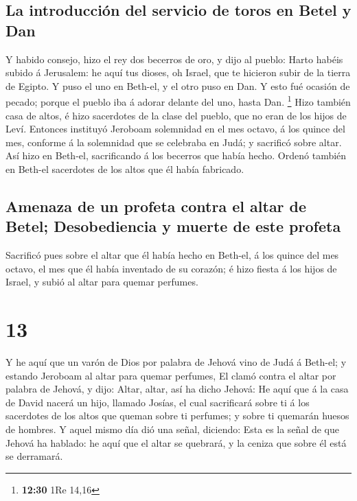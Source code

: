 \hypertarget{la-introducciuxf3n-del-servicio-de-toros-en-betel-y-dan}{%
\subsection{La introducción del servicio de toros en Betel y
Dan}\label{la-introducciuxf3n-del-servicio-de-toros-en-betel-y-dan}}

 Y habido consejo, hizo el rey dos becerros de oro, y dijo
al pueblo: Harto habéis subido á Jerusalem: he aquí tus dioses, oh
Israel, que te hicieron subir de la tierra de Egipto.  Y
puso el uno en Beth-el, y el otro puso en Dan.  Y esto fué
ocasión de pecado; porque el pueblo iba á adorar delante del uno, hasta
Dan. \footnote{\textbf{12:30} 1Re 14,16}  Hizo también casa
de altos, é hizo sacerdotes de la clase del pueblo, que no eran de los
hijos de Leví.  Entonces instituyó Jeroboam solemnidad en
el mes octavo, á los quince del mes, conforme á la solemnidad que se
celebraba en Judá; y sacrificó sobre altar. Así hizo en Beth-el,
sacrificando á los becerros que había hecho. Ordenó también en Beth-el
sacerdotes de los altos que él había fabricado.

\hypertarget{amenaza-de-un-profeta-contra-el-altar-de-betel-desobediencia-y-muerte-de-este-profeta}{%
\subsection{Amenaza de un profeta contra el altar de Betel;
Desobediencia y muerte de este
profeta}\label{amenaza-de-un-profeta-contra-el-altar-de-betel-desobediencia-y-muerte-de-este-profeta}}

 Sacrificó pues sobre el altar que él había hecho en
Beth-el, á los quince del mes octavo, el mes que él había inventado de
su corazón; é hizo fiesta á los hijos de Israel, y subió al altar para
quemar perfumes.

\hypertarget{section-12}{%
\section{13}\label{section-12}}

 Y he aquí que un varón de Dios por palabra de Jehová vino
de Judá á Beth-el; y estando Jeroboam al altar para quemar perfumes,
 El clamó contra el altar por palabra de Jehová, y dijo:
Altar, altar, así ha dicho Jehová: He aquí que á la casa de David nacerá
un hijo, llamado Josías, el cual sacrificará sobre ti á los sacerdotes
de los altos que queman sobre ti perfumes; y sobre ti quemarán huesos de
hombres.  Y aquel mismo día dió una señal, diciendo: Esta es
la señal de que Jehová ha hablado: he aquí que el altar se quebrará, y
la ceniza que sobre él está se derramará.


